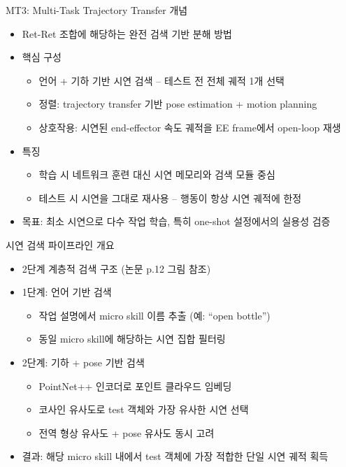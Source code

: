 \documentclass[aspectratio=169]{beamer}
\begin{document}
\begin{frame}{MT3: Multi-Task Trajectory Transfer 개념}
  \small
  \begin{itemize}
    \item Ret-Ret 조합에 해당하는 완전 검색 기반 분해 방법
    \item 핵심 구성
    \begin{itemize}
      \item 언어 + 기하 기반 시연 검색 – 테스트 전 전체 궤적 1개 선택
      \item 정렬: trajectory transfer 기반 pose estimation + motion planning
      \item 상호작용: 시연된 end-effector 속도 궤적을 EE frame에서 open-loop 재생
    \end{itemize}
    \item 특징
    \begin{itemize}
      \item 학습 시 네트워크 훈련 대신 시연 메모리와 검색 모듈 중심
      \item 테스트 시 시연을 그대로 재사용 – 행동이 항상 시연 궤적에 한정
    \end{itemize}
    \item 목표: 최소 시연으로 다수 작업 학습, 특히 one-shot 설정에서의 실용성 검증
  \end{itemize}
\end{frame}

\begin{frame}{시연 검색 파이프라인 개요}
  \small
  \begin{itemize}
    \item 2단계 계층적 검색 구조 (논문 p.12 그림 참조)
    \item 1단계: 언어 기반 검색
    \begin{itemize}
      \item 작업 설명에서 micro skill 이름 추출 (예: ``open bottle'')
      \item 동일 micro skill에 해당하는 시연 집합 필터링
    \end{itemize}
    \item 2단계: 기하 + pose 기반 검색
    \begin{itemize}
      \item PointNet++ 인코더로 포인트 클라우드 임베딩
      \item 코사인 유사도로 test 객체와 가장 유사한 시연 선택
      \item 전역 형상 유사도 + pose 유사도 동시 고려
    \end{itemize}
    \item 결과: 해당 micro skill 내에서 test 객체에 가장 적합한 단일 시연 궤적 획득
  \end{itemize}
\end{frame}
\end{document}

